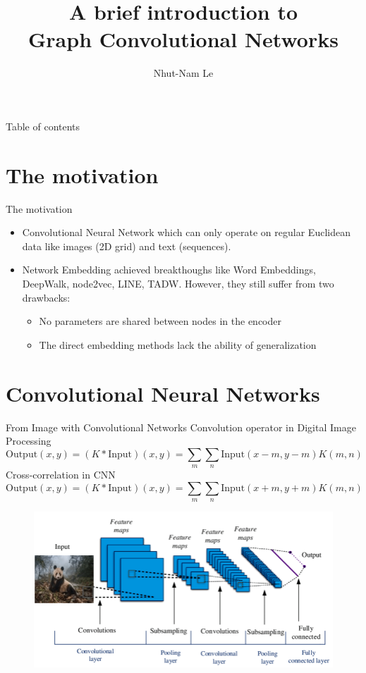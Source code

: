 \documentclass[notheorems, aspectratio=54]{beamer}
\title[A brief intro to GCNs]{A brief introduction to \\ Graph Convolutional Networks}
\author{Nhut-Nam Le}
\institute[HCMUS]{Computer Science Department, Information Technology, HCMUS, VNU}
\begin{document}
	
	\begin{frame}
		\titlepage
	\end{frame}
	
	\begin{frame}{Table of contents}
		\tableofcontents
	\end{frame}
	\section{The motivation}
	\begin{frame}{The motivation}
		\begin{itemize}
			\item Convolutional Neural Network which can only operate on regular Euclidean data like images (2D grid) and text (sequences).
			\item Network Embedding achieved breakthoughs like Word Embeddings, DeepWalk, node2vec, LINE, TADW. However, they still suffer from two drawbacks:
			\begin{itemize}
				\item No parameters are shared between nodes in the encoder
				\item The direct embedding methods lack the ability of generalization
			\end{itemize}
		\end{itemize}
	\end{frame}
	\section{Convolutional Neural Networks}
	\begin{frame}{From Image with Convolutional Networks}
		Convolution operator in Digital Image Processing
		\begin{equation}
			\text{Output}(x, y) = (K * \text{Input})(x, y) = \sum_m\sum_n\text{Input}(x-m, y-m)K(m,n)
		\end{equation}
		Cross-correlation in CNN
		\begin{equation}
			\text{Output}(x, y) = (K * \text{Input})(x, y) = \sum_m\sum_n\text{Input}(x+m, y+m)K(m,n)
		\end{equation}
		\begin{figure}[H]
			\centering
			\includegraphics[width=.75\linewidth]{figs/An-example-of-a-simple-CNN-architecture.png}
			\label{fig:writing-thesis}
		\end{figure}
	\end{frame}
\end{document}

